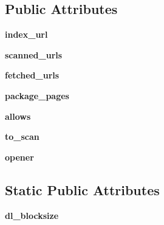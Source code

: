 \subsection*{Public Attributes}
\begin{DoxyCompactItemize}
\item 
\mbox{\label{classsetuptools_1_1package__index_1_1_package_index_a880d354bb91944645d4a722ca09a882a}} 
{\bfseries index\+\_\+url}
\item 
\mbox{\label{classsetuptools_1_1package__index_1_1_package_index_a1b19cf2d09314c588a24a9b4fb48ebf8}} 
{\bfseries scanned\+\_\+urls}
\item 
\mbox{\label{classsetuptools_1_1package__index_1_1_package_index_a6a6207235d64b4b520712153f9c697d1}} 
{\bfseries fetched\+\_\+urls}
\item 
\mbox{\label{classsetuptools_1_1package__index_1_1_package_index_a211df1c12665d1f6de7e2099a3aed30d}} 
{\bfseries package\+\_\+pages}
\item 
\mbox{\label{classsetuptools_1_1package__index_1_1_package_index_ae064a13c505539a8447e3fbb527c26b5}} 
{\bfseries allows}
\item 
\mbox{\label{classsetuptools_1_1package__index_1_1_package_index_a8e17032ca68311191142a563ec67c3e6}} 
{\bfseries to\+\_\+scan}
\item 
\mbox{\label{classsetuptools_1_1package__index_1_1_package_index_ab91302a7a7b70255404a48b19dc7e2f7}} 
{\bfseries opener}
\end{DoxyCompactItemize}
\subsection*{Static Public Attributes}
\begin{DoxyCompactItemize}
\item 
\mbox{\label{classsetuptools_1_1package__index_1_1_package_index_a70baeb1c0096f519c9c0281821a838e9}} 
{\bfseries dl\+\_\+blocksize}
\end{DoxyCompactItemize}


